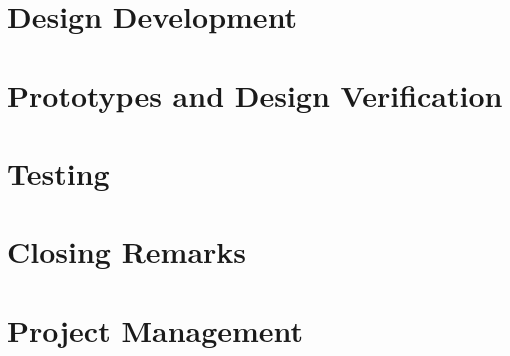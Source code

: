 \documentclass[en, screen, 12pt]{report}
\begin{document}








\chapter{Design Development}

\chapter{Prototypes and Design Verification}

\chapter{Testing}

\chapter{Closing Remarks}


\chapter{Project Management}

\appendix



\newpage
\printbibliography
\end{document}
